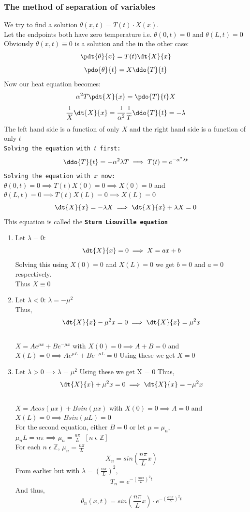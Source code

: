 \documentclass[11pt]{article}
\theoremstyle{definition}
\newcommand{\Z}{\mathbb{Z}}
\begin{document}
\subsubsection{The method of separation of variables}
We try to find a solution $\theta(x,t) = T(t)\cdot X(x)$. \\Let the endpoints both have zero temperature i.e. $\theta(0,t) = 0$ and $\theta(L,t) = 0$\\
Obviously $\theta(x,t) \equiv 0$ is a solution and the in the other case:
$$\pdt{\theta}{x} = T(t)\dt{X}{x}$$
$$\pdo{\theta}{t} = X\ddo{T}{t}$$
Now our heat equation becomes:
$$\alpha^2 T\pdt{X}{x} = \pdo{T}{t}X$$
$$\frac{1}{X}\dt{X}{x} = \frac{1}{\alpha^2}\frac{1}{T}\ddo{T}{t} = -\lambda$$
The left hand side is a function of only $X$ and the right hand side is a function of only $t$\\
\texttt{Solving the equation with $t$ first:}\\
$$\ddo{T}{t} = -\alpha^2 \lambda T \implies T(t) =  e^{-\alpha^2 \lambda t}$$
\texttt{Solving the equation with $x$ now:}\\
$\theta(0, t) = 0 \implies T(t)X(0) = 0 \implies X(0) = 0$ and
$\theta(L, t) = 0 \implies T(t)X(L) = 0 \implies X(L) = 0$
$$\dt{X}{x} = -\lambda X \implies \dt{X}{x} + \lambda X = 0$$
This equation is called the \textbf{\texttt{Sturm Liouville equation}}\\
\begin{enumerate}
    \item Let $\lambda = 0$:
    $$\dt{X}{x} = 0 \implies X = ax + b$$
    Solving this using $X(0) = 0 $ and $X(L) = 0$ we get $b = 0$ and $a = 0$ respectively.\\
    Thus $X \equiv 0$
    \item Let $\lambda < 0$:
    $\lambda = -\mu^2$\\
    Thus,
    $$\dt{X}{x} -\mu^2x = 0 \implies \dt{X}{x} = \mu^2x$$\\
    $X = Ae^{\mu x} + Be^{-\mu x}$ with $X(0) = 0 \implies A + B = 0$ and $X(L) = 0 \implies Ae^{\mu L} + Be^{-\mu L} = 0$
    Using these we get $X = 0$
    \item Let $\lambda > 0 \implies \lambda = \mu^2$
    Using these we get X = 0
     Thus,
    $$\dt{X}{x} +\mu^2x = 0 \implies \dt{X}{x} = -\mu^2x$$\\
    $X = Acos(\mu x) + Bsin(\mu x)$ with $X(0) = 0 \implies A = 0$ and\\ $X(L) = 0 \implies Bsin(\mu L) = 0$\\
    For the second equation, either $B = 0$ or
    let $\mu = \mu_n$, $\mu_n L = n\pi \implies \mu_n = \frac{n\pi}{L} \;\; [n\; \epsilon\; \Z]$\\
    For each $n\; \epsilon\; \Z$, $\mu_n = \frac{n\pi}{L}$
    $$X_n = sin(\frac{n\pi}{L}x)$$
    From earlier but with $\lambda = (\frac{n\pi}{L})^2$,
    $$T_n = e^{-(\frac{\alpha n\pi}{L})^2t}$$
    And thus,
    $$\theta_n(x,t) = sin(\frac{n\pi}{L}x) \cdot e^{-(\frac{\alpha n\pi}{L})^2t}$$
\end{enumerate}
\end{document}
